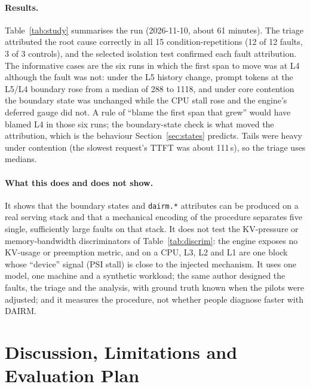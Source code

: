 \documentclass[11pt]{article}
\begin{document}
\paragraph{Results.} Table~\ref{tab:study} summarises the run (2026-11-10, about 61 minutes). The triage attributed the root cause correctly in all 15 condition-repetitions (12 of 12 faults, 3 of 3 controls), and the selected isolation test confirmed each fault attribution. The informative cases are the six runs in which the first span to move was at L4 although the fault was not: under the L5 history change, prompt tokens at the L5/L4 boundary rose from a median of 288 to 1118, and under core contention the boundary state was unchanged while the CPU stall rose and the engine's deferred gauge did not. A rule of ``blame the first span that grew'' would have blamed L4 in those six runs; the boundary-state check is what moved the attribution, which is the behaviour Section~\ref{sec:states} predicts. Tails were heavy under contention (the slowest request's TTFT was about 111\,s), so the triage uses medians.

\paragraph{What this does and does not show.} It shows that the boundary states and \texttt{dairm.*} attributes can be produced on a real serving stack and that a mechanical encoding of the procedure separates five single, sufficiently large faults on that stack. It does not test the KV-pressure or memory-bandwidth discriminators of Table~\ref{tab:discrim}: the engine exposes no KV-usage or preemption metric, and on a CPU, L3, L2 and L1 are one block whose ``device'' signal (PSI stall) is close to the injected mechanism. It uses one model, one machine and a synthetic workload; the same author designed the faults, the triage and the analysis, with ground truth known when the pilots were adjusted; and it measures the procedure, not whether people diagnose faster with DAIRM.

\section{Discussion, Limitations and Evaluation Plan}
\label{sec:discussion}
\end{document}
